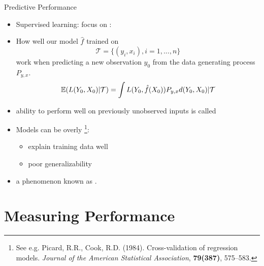 \documentclass[10pt,handout]{beamer}
\begin{document}
\begin{frame}{Predictive Performance}


\begin{itemize}
\item Supervised learning: focus on :
\item How well our model $\hat{f}$ trained on
\[
\mathcal{T}=\{(y_i, x_i), i = 1, ..., n\}
\]
work when predicting a new observation $y_0$ from the data generating process $P_{y,x}$.
\[
\operatorname{\mathbb{E}}(L(Y_0,X_0)|\mathcal{T}) = \int L(Y_0, \hat{f}(X_0)) P_{y,x} d(Y_0,X_0) |\mathcal{T}
\]
\item ability to perform well on previously unobserved inputs is called 



\item Models can be overly \footnote{See e.g. Picard, R.R., Cook, R.D. (1984). Cross-validation of regression models. \emph{Journal of the American Statistical Association}, \textbf{79(387)}, 575--583.}:
\begin{itemize}
\item explain training data well
\item poor generalizability
\end{itemize}
\item a phenomenon known as .
\end{itemize}

\end{frame}

\section{Measuring Performance}
\frame{\sectionpage}
\end{document}
